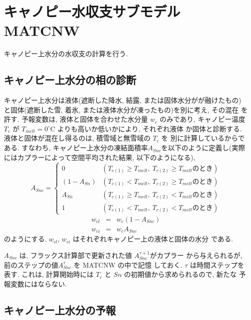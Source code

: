 
\section{キャノピー水収支サブモデル MATCNW}

キャノピー上水分の水収支の計算を行う.

\subsection{キャノピー上水分の相の診断}

キャノピー上水分は液体(遮断した降水, 結露, または固体水分がが融けたもの)
と固体(遮断した雪, 着氷, または液体水分が凍ったもの)を別に考え, その混在
を許す.
予報変数は, 液体と固体を合わせた水分量 $w_c$ のみであり, キャノピー温度
$T_c$ が $T_{melt} = 0^{\circ}$C よりも高いか低いかにより, それぞれ液体
か固体と診断する. 液体と固体が混在し得るのは, 積雪域と無雪域の $T_c$ を
別に計算しているからである.
すなわち, キャノピー上水分の凍結面積率$A_{Snc}$を以下のように定義し(実際
にはカプラーによって空間平均された結果, 以下のようになる),
\begin{equation}
 A_{Snc} = \left\{
\begin{array}{ll}
 0 & (T_{c(1)} \geq T_{melt}, \ T_{c(2)} \geq T_{melt} \mbox{のとき})\\
 (1-A_{Sn}) & (T_{c(1)} < T_{melt}, \ T_{c(2)} \geq T_{melt} \mbox{のとき})\\
 A_{Sn} & (T_{c(1)} \geq T_{melt}, \ T_{c(2)} < T_{melt} \mbox{のとき})\\
 1 & (T_{c(1)} < T_{melt}, \ T_{c(2)} < T_{melt} \mbox{のとき})
\end{array}
\right.
\end{equation}
\begin{eqnarray}
 w_{cl} &=& w_c ( 1 - A_{Snc}) \\
 w_{ci} &=& w_c A_{Snc}
\end{eqnarray}
のようにする. $w_{cl}$, $w_{ci}$ はそれぞれキャノピー上の液体と固体の水分
である.

$A_{Snc}$ は, フラックス計算部で更新された値 $A_{Snc}^{\tau+1}$がカプラー
から与えられるが, 前のステップの値$A_{Snc}^{\tau}$ を MATCNW の中で記憶
しておく. $\tau$ は時間ステップを表す.
これは, 計算開始時には $T_c$ と $Sn$ の初期値から求められるので, 新たな
予報変数にはならない.

\subsection{キャノピー上水分の予報}

